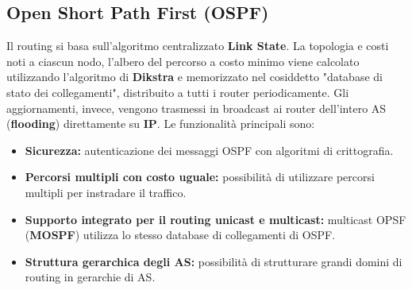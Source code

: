 \subsection{Open Short Path First (OSPF)}
Il routing si basa sull'algoritmo centralizzato \textbf{Link State}. La topologia e costi noti a ciascun nodo, l'albero del percorso a costo minimo viene calcolato utilizzando l'algoritmo di \textbf{Dikstra} e memorizzato nel cosiddetto "database di stato dei collegamenti", distribuito a tutti i router periodicamente. Gli aggiornamenti, invece, vengono trasmessi in broadcast ai router dell'intero AS (\textbf{flooding}) direttamente su \textbf{IP}.
Le funzionalità principali sono: 
\begin{itemize}
    \item \textbf{Sicurezza:} autenticazione dei messaggi OSPF con algoritmi di crittografia.
    \item \textbf{Percorsi multipli con costo uguale:} possibilità di utilizzare percorsi multipli per instradare il traffico.
    \item \textbf{Supporto integrato per il routing unicast e multicast:} multicast OPSF (\textbf{MOSPF}) utilizza lo stesso database di collegamenti di OSPF.
    \item \textbf{Struttura gerarchica degli AS:} possibilità di strutturare grandi domini di routing in gerarchie di AS.
\end{itemize}

